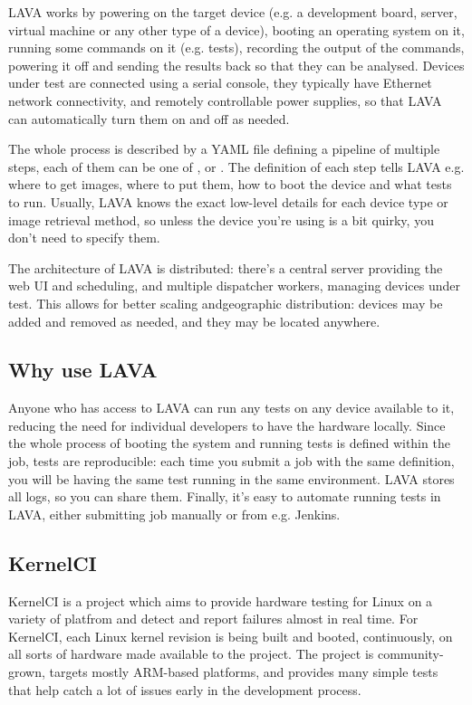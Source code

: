 \documentclass[10pt, a5paper]{article}
\begin{document}
LAVA works by powering on the target device (e.g. a development board, server, virtual machine or any other type of a device), booting an operating system on it, running some commands on it (e.g. tests), recording the output of the commands, powering it off and sending the results back so that they can be analysed. Devices under test are connected using a serial console, they typically have Ethernet network connectivity, and remotely controllable power supplies, so that LAVA can automatically turn them on and off as needed.

The whole process is described by a YAML file defining a pipeline of multiple steps, each of them can be one of \verb@deploy@, \verb@boot@ or \verb@test@. The definition of each step tells LAVA e.g. where to get images, where to put them, how to boot the device and what tests to run. Usually, LAVA knows the exact low-level details for each device type or image retrieval method, so unless the device you’re using is a bit quirky, you don’t need to specify them.

The architecture of LAVA is distributed: there’s a central server providing the web UI and scheduling, and multiple dispatcher workers, managing devices under test. This allows for better scaling and\linebreak geographic distribution: devices may be added and removed as needed, and they may be located anywhere.

\subsection*{Why use LAVA}

Anyone who has access to LAVA can run any tests on any device available to it, reducing the need for individual developers to have the hardware locally. Since the whole process of booting the system and running tests is defined within the job, tests are reproducible: each time you submit a job with the same definition, you will be having the same test running in the same environment. LAVA stores all logs, so you can share them. Finally, it’s easy to automate running tests in LAVA, either submitting job manually or from e.g. Jenkins.

\subsection*{KernelCI}

KernelCI is a project which aims to provide hardware testing for Linux on a variety of platfrom and detect and report failures almost in real time. For KernelCI, each Linux kernel revision is being built and booted, continuously, on all sorts of hardware made available to the project. The project is community-grown, targets mostly ARM-based platforms, and provides many simple tests that help catch a lot of issues early in the development process.
\end{document}
